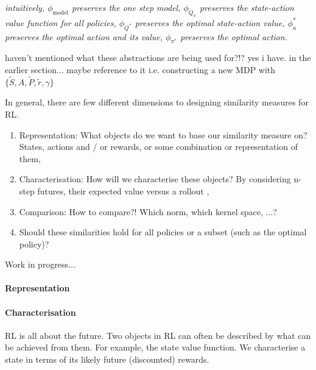 \textit{intuitively,
$\phi_{\text{model}}$ preserves the one step model,
$\phi_{Q_{\pi}}$ preserves the state-action value function for all policies,
$\phi_{Q^{* }}$ preserves the optimal state-action value,
$\phi_a^{* }$ preserves the optimal action and its value,
$\phi_{\pi^{* }}$ preserves the optimal action.}\cite{Littman2006}

{\color{red}haven't mentioned what these abstractions are being used for?!? yes i have. in the earlier section... maybe reference to it}
i.e. constructing a new MDP with $\{\tilde S, A, \tilde P, \tilde r, \gamma\}$

In general, there are few different dimensions to designing similarity measures for RL.

\begin{enumerate}
  \tightlist
  \item Representation: What objects do we want to base our similarity measure on? States, actions and / or rewards, or some combination or representation of them,
  \item Characterisation: How will we characterise these objects? By considering n-step futures, their expected value versus a rollout \footnotemark[9],
  \item Comparison: How to compare?! Which norm, which kernel space, ...?
  \item Should these similarities hold for all policies or a subset (such as the optimal policy)?
\end{enumerate}



{\color{red}Work in progress...}

\paragraph{Representation}



\paragraph{Characterisation}

RL is all about the future. Two objects in RL can often be described by what can
be achieved from them. For example, the state value function. We characterise a state in terms of
its likely future (discounted) rewards.

